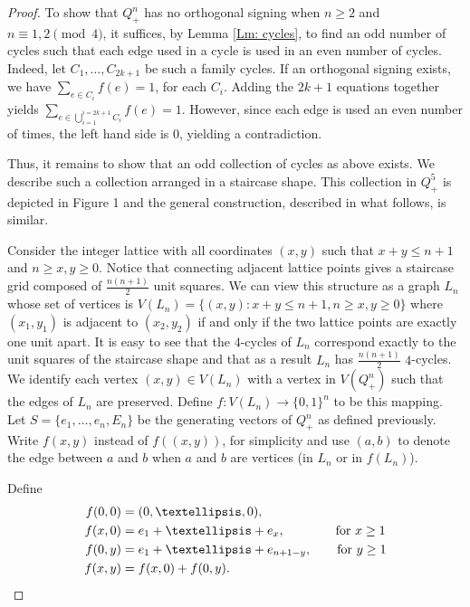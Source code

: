 \documentclass[11pt]{article}
\begin{document}
\begin{proof}
To show that $Q_+^n$ has no orthogonal signing when $n \geq 2$ and $n \equiv 1, 2 \pmod{4}$, it suffices, by Lemma \ref{Lm: cycles}, to find an odd number of cycles such that each edge used in a cycle is used in an even number of cycles.
Indeed, let $C_1, \ldots, C_{2k+1}$ be such a family
cycles. If an orthogonal signing exists, we 
have $\sum_{e \in C_{i}} f(e) = 1$, for each $C_i$. Adding 
the $2k+1$ equations together yields 
$\sum_{e \in \bigcup_{i=1}^{i=2k+1}C_i} f(e) = 1$. 
However, since each edge is used an even number of times, the left 
hand side is $0$, yielding a contradiction. 

Thus, it remains to show that an odd collection of cycles as above 
exists. We describe such a collection arranged in a 
staircase shape. This collection in $Q_+^5$ is depicted in Figure 1 
and the general construction, described in what follows, is similar. 

Consider the integer lattice with all coordinates $(x, y)$ such 
that $x+y \leq n+1$ and $n\geq x, y \geq 0$. Notice that 
connecting adjacent lattice points gives a staircase grid 
composed of $\frac{n(n+1)}{2}$ unit squares. We can view this 
structure as a graph $L_n$ whose set of vertices is
$V(L_n)= \{(x,y): x+y \leq n+1, n\geq x,y\geq0 \}$ where 
$(x_1, y_1)$ is adjacent to $(x_2, y_2)$ if and only if the two lattice points are exactly one unit apart. It is easy to see that the $4$-cycles of $L_n$ 
correspond exactly to the unit squares of the staircase shape 
and that as a result $L_n$ has $\frac{n(n+1)}{2}$ $4$-cycles.
We identify each vertex $(x,y) \in V(L_n)$ with a vertex 
in $V(Q_+^n)$ such that the edges  of $L_n$ are preserved. 
Define $f: V(L_n) \xrightarrow{} \{0, 1\}^n$ to be this mapping. 
Let $S = \{e_1, \ldots, e_n, E_n \}$ be the generating vectors 
of $Q_+^n$ as defined previously. 
Write $f(x,y)$ instead of $f((x,y))$, for simplicity and use $(a,b)$ to denote the edge between $a$ and $b$ 
when $a$ and $b$ are vertices (in $L_n$ or in $f(L_n)$).

Define 
\begin{align*}
    f(0,0) &= (0, \ldots, 0), \\
    f(x, 0) &= e_1 + \ldots + e_x, \quad \quad \quad \text{\quad for $x \geq 1$} \\ 
    f(0, y) &= e_1 + \ldots + e_{n+1-y}, \quad \quad \text{for $y \geq 1$} \\
    f(x, y) &= f(x, 0) + f(0, y).
\end{align*}


\end{proof}
\end{document}
